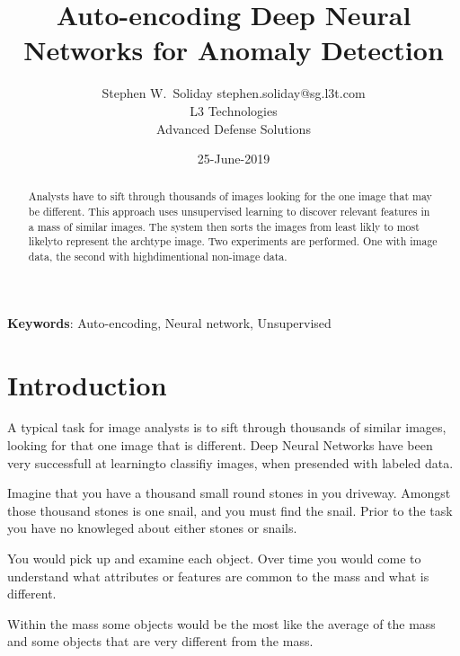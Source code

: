 \documentclass{article}
\begin{document}
\title{Auto-encoding Deep Neural Networks for Anomaly Detection}
\author{ \name Stephen W.~Soliday \email stephen.soliday@sg.l3t.com \\
  \addr L3 Technologies \\ Advanced Defense Solutions
}
\date{25-June-2019}

\maketitle

\begin{abstract}%

  Analysts have to sift through thousands of images looking for the one image that may be different.
  This approach uses unsupervised learning to discover relevant features in a mass of similar images.
  The system then sorts the images from least likly to most likelyto represent the archtype image.
  Two experiments are performed. One with image data, the second with highdimentional non-image data.
  
\end{abstract}

\vspace{12pt}
\textbf{Keywords}: Auto-encoding, Neural network, Unsupervised

\section{Introduction\label{sec:intro}}

A typical task for image analysts is to sift through thousands of similar images, looking
for that one image that is different. Deep Neural Networks have been very successfull at
learningto classifiy images, when presended with labeled data.

Imagine that you have a thousand small round stones in you driveway.
Amongst those thousand stones is one snail, and you must find the snail.
Prior to the task you have no knowleged about either stones or snails.

You would pick up and examine each object. Over time you would come to
understand what attributes or features are common to the mass and what is different.

Within the mass some objects would be the most like the average of the mass and some
objects that are very different from the mass.
\end{document}
